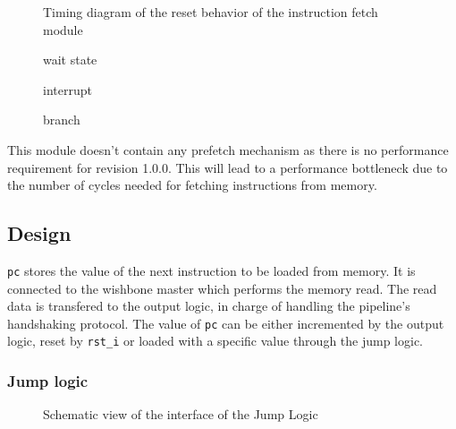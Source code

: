 \begin{figure}[H]
    \centering
    
    \caption{Timing diagram of the reset behavior of the instruction fetch module}
    \label{fig:ifm-behavior-reset}
\end{figure}

\begin{figure}[H]
    \centering
%    
    \caption{wait state}
    \label{fig:ifm-behavior-wait}
\end{figure}

\begin{figure}[H]
    \centering
%    
    \caption{interrupt}
    \label{fig:ifm-behavior-interrupt}
\end{figure}

\begin{figure}[H]
    \centering
%    
    \caption{branch}
    \label{fig:ifm-behavior-branch}
\end{figure}

\begin{content}
  This module doesn't contain any prefetch mechanism as there is no performance requirement for revision 1.0.0. This will lead to a performance bottleneck due to the number of cycles needed for fetching instructions from memory.
\end{content}

\subsection{Design}

\begin{content}
  \texttt{pc} stores the value of the next instruction to be loaded from memory. It is connected to the wishbone master which performs the memory read. The read data is transfered to the output logic, in charge of handling the pipeline's handshaking protocol. The value of \texttt{pc} can be either incremented by the output logic, reset by \texttt{rst\_i} or loaded with a specific value through the jump logic.
\end{content}

\subsubsection{Jump logic}

\begin{figure}[H]
    \centering
    
    \caption{Schematic view of the interface of the Jump Logic}
    \label{fig:jump-logic}
\end{figure}

